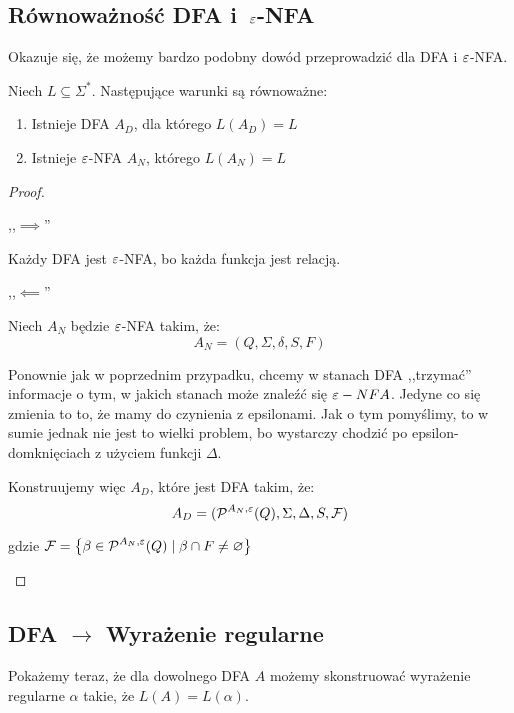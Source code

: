\subsection{Równoważność DFA i~\texorpdfstring{\(\varepsilon\)}{epsilon}-NFA}

Okazuje się, że możemy bardzo podobny dowód przeprowadzić dla DFA i \( \varepsilon\)-NFA.

\begin{theorem}
	Niech \( L \subseteq \Sigma^* \).
	Następujące warunki są równoważne:
	\begin{enumerate}
		\item Istnieje DFA \( A_D \), dla którego \( L(A_D) = L \)
		\item Istnieje \(\varepsilon\)-NFA \( A_N \), którego \( L(A_N) = L \)
	\end{enumerate}
\end{theorem}
\begin{proof}
	\begin{description}
		\item ,,\( \implies \)''

		      Każdy DFA jest \(\varepsilon\)-NFA, bo każda funkcja jest relacją.

		\item ,,\( \impliedby \)''

		      Niech \(A_N\) będzie \(\varepsilon\)-NFA takim, że:
		      \[ A_N = (Q, \Sigma, \delta, S, F) \]

		      Ponownie jak w poprzednim przypadku, chcemy w stanach DFA ,,trzymać'' informacje o tym, w jakich stanach może znaleźć się \(\varepsilon-NFA\). Jedyne co się zmienia to to, że mamy do czynienia z epsilonami. Jak o tym pomyślimy, to w sumie jednak nie jest to wielki problem, bo wystarczy chodzić po epsilon-domknięciach z użyciem funkcji \( \Delta \).

		      Konstruujemy więc \(A_D\), które jest DFA takim, że:
		      \[ A_D = (\operatorname{\mathcal{P}}^{A_N, \varepsilon}(Q), \Sigma, \Delta, S, \mathcal{F})\]

		      gdzie \( \mathcal{F} = \set{\beta \in \powerset^{A_N, \eps}(Q) \mid \beta \cap F \neq \varnothing} \)
	\end{description}
\end{proof}


\subsection{DFA \texorpdfstring{\( \rightarrow \)}{na} Wyrażenie regularne}

Pokażemy teraz, że dla dowolnego DFA \(A\) możemy skonstruować wyrażenie regularne \(\alpha\) takie, że \( L(A) = L(\alpha)\).

